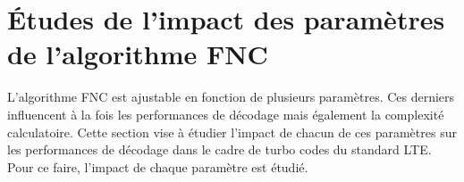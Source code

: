 \begin{table}[!h]
\centering
\caption{Caractérisation des différentes architectures matérielles de turbo décodeur existantes dans la littérature}
\label{tab:compa}
\end{table}


\newpage
\section{Études de l'impact des paramètres de l'algorithme FNC}
L'algorithme FNC est ajustable en fonction de plusieurs paramètres. Ces derniers influencent à la fois les performances de décodage mais également
la complexité calculatoire. Cette section vise à étudier l'impact de chacun de ces paramètres sur les performances de 
décodage dans le cadre de turbo codes du standard LTE. Pour ce faire, l'impact de chaque paramètre est étudié.

